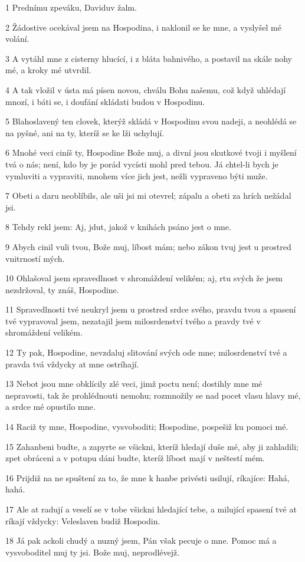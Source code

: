 \par 1 Prednímu zpeváku, Daviduv žalm.
\par 2 Žádostive ocekával jsem na Hospodina, i naklonil se ke mne, a vyslyšel mé volání.
\par 3 A vytáhl mne z cisterny hlucící, i z bláta bahnivého, a postavil na skále nohy mé, a kroky mé utvrdil.
\par 4 A tak vložil v ústa má písen novou, chválu Bohu našemu, což když uhlédají mnozí, i báti se, i doufání skládati budou v Hospodinu.
\par 5 Blahoslavený ten clovek, kterýž skládá v Hospodinu svou nadeji, a neohlédá se na pyšné, ani na ty, kteríž se ke lži uchylují.
\par 6 Mnohé veci ciníš ty, Hospodine Bože muj, a divní jsou skutkové tvoji i myšlení tvá o nás; není, kdo by je porád vycísti mohl pred tebou. Já chtel-li bych je vymluviti a vypraviti, mnohem více jich jest, nežli vypraveno býti muže.
\par 7 Obeti a daru neoblíbils, ale uši jsi mi otevrel; zápalu a obeti za hrích nežádal jsi.
\par 8 Tehdy rekl jsem: Aj, jdut, jakož v knihách psáno jest o mne.
\par 9 Abych cinil vuli tvou, Bože muj, líbost mám; nebo zákon tvuj jest u prostred vnitrností mých.
\par 10 Ohlašoval jsem spravedlnost v shromáždení velikém; aj, rtu svých že jsem nezdržoval, ty znáš, Hospodine.
\par 11 Spravedlnosti tvé neukryl jsem u prostred srdce svého, pravdu tvou a spasení tvé vypravoval jsem, nezatajil jsem milosrdenství tvého a pravdy tvé v shromáždení velikém.
\par 12 Ty pak, Hospodine, nevzdaluj slitování svých ode mne; milosrdenství tvé a pravda tvá vždycky at mne ostríhají.
\par 13 Nebot jsou mne obklícily zlé veci, jimž poctu není; dostihly mne mé nepravosti, tak že prohlédnouti nemohu; rozmnožily se nad pocet vlasu hlavy mé, a srdce mé opustilo mne.
\par 14 Raciž ty mne, Hospodine, vysvoboditi; Hospodine, pospešiž ku pomoci mé.
\par 15 Zahanbeni budte, a zapyrte se všickni, kteríž hledají duše mé, aby ji zahladili; zpet obráceni a v potupu dáni budte, kteríž líbost mají v neštestí mém.
\par 16 Prijdiž na ne spuštení za to, že mne k hanbe privésti usilují, ríkajíce: Hahá, hahá.
\par 17 Ale at radují a veselí se v tobe všickni hledající tebe, a milující spasení tvé at ríkají vždycky: Veleslaven budiž Hospodin.
\par 18 Já pak ackoli chudý a nuzný jsem, Pán však pecuje o mne. Pomoc má a vysvoboditel muj ty jsi. Bože muj, neprodlévejž.

